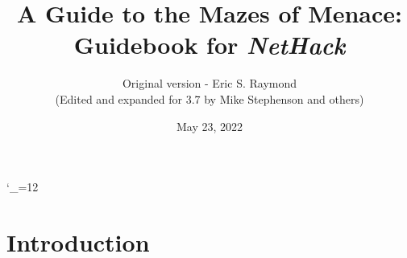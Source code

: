 \textheight 220mm
\textwidth 160mm
\oddsidemargin 0mm
\evensidemargin 0mm
\topmargin 0mm

\newcommand{\nd}{\noindent}

\newcommand{\tb}[1]{\tt #1 \hfill}
\newcommand{\bb}[1]{\bf #1 \hfill}
\newcommand{\ib}[1]{\it #1 \hfill}

\newcommand{\blist}[1]
{\begin{list}{$\bullet$}
    {\leftmargin 30mm \topsep 2mm \partopsep 0mm \parsep 0mm \itemsep 1mm
     \labelwidth 28mm \labelsep 2mm
     #1}}

\newcommand{\elist}{\end{list}}

\catcode`\_=12


%
%

\title{\LARGE A Guide to the Mazes of Menace:\\
\Large Guidebook for {\it NetHack\/}}

\author{Original version - Eric S. Raymond\\
(Edited and expanded for 3.7 by Mike Stephenson and others)}
\date{May 23, 2022}

\maketitle

\section{Introduction}


